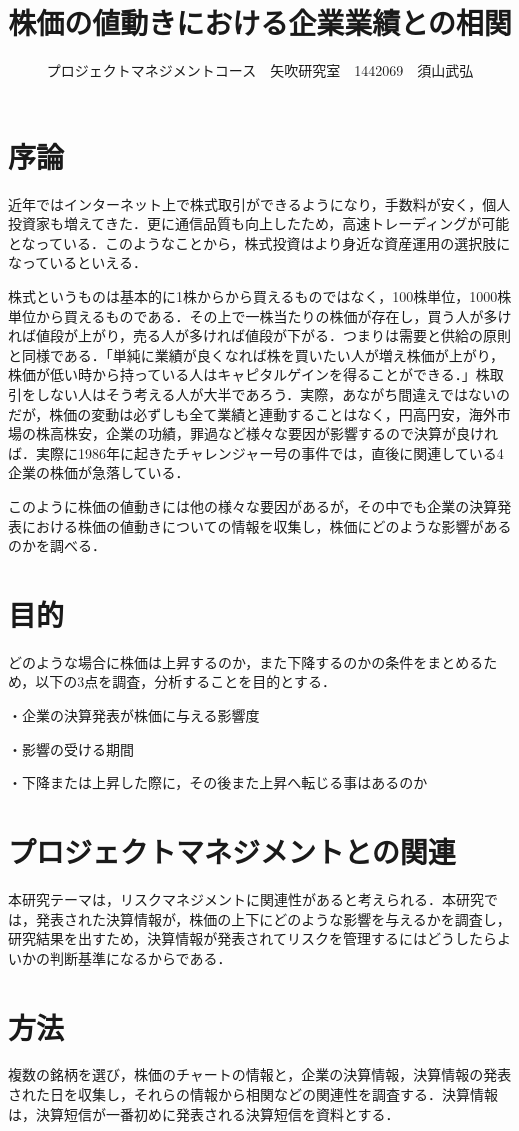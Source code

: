 \documentclass[uplatex,twocolumn,dvipdfmx]{jsarticle}
\title{\vspace{-5mm}\fontsize{14pt}{0pt}\selectfont 株価の値動きにおける企業業績との相関}
\author{\normalsize プロジェクトマネジメントコース　矢吹研究室　1442069　須山武弘}
\date{}
\begin{document}
\fontsize{10.5pt}{\baselineskip}\selectfont
\maketitle





\section{序論}
近年ではインターネット上で株式取引ができるようになり，手数料が安く，個人投資家も増えてきた．更に通信品質も向上したため，高速トレーディングが可能となっている．\cite{bib01}このようなことから，株式投資はより身近な資産運用の選択肢になっているといえる．

株式というものは基本的に1株からから買えるものではなく，100株単位，1000株単位から買えるものである．その上で一株当たりの株価が存在し，買う人が多ければ値段が上がり，売る人が多ければ値段が下がる．つまりは需要と供給の原則と同様である．「単純に業績が良くなれば株を買いたい人が増え株価が上がり，株価が低い時から持っている人はキャピタルゲインを得ることができる．」株取引をしない人はそう考える人が大半であろう．実際，あながち間違えではないのだが，株価の変動は必ずしも全て業績と連動することはなく，円高円安，海外市場の株高株安，企業の功績，罪過など様々な要因が影響するので決算が良ければ．実際に1986年に起きたチャレンジャー号の事件では，直後に関連している4企業の株価が急落している．\cite{bib02}

このように株価の値動きには他の様々な要因があるが，その中でも企業の決算発表における株価の値動きについての情報を収集し，株価にどのような影響があるのかを調べる．

\section{目的}
どのような場合に株価は上昇するのか，また下降するのかの条件をまとめるため，以下の3点を調査，分析することを目的とする．

・企業の決算発表が株価に与える影響度

・影響の受ける期間

・下降または上昇した際に，その後また上昇へ転じる事はあるのか

\section{プロジェクトマネジメントとの関連}
本研究テーマは，リスクマネジメントに関連性があると考えられる．本研究では，発表された決算情報が，株価の上下にどのような影響を与えるかを調査し，研究結果を出すため，決算情報が発表されてリスクを管理するにはどうしたらよいかの判断基準になるからである．

\section{方法}
複数の銘柄を選び，株価のチャートの情報と，企業の決算情報，決算情報の発表された日を収集し，それらの情報から相関などの関連性を調査する．決算情報は，決算短信が一番初めに発表される決算短信を資料とする．\cite{bib03}


\end{document}
